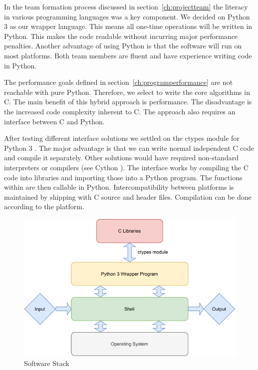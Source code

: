 In the team formation process discussed in section~\ref{ch:projectteam} the literacy in various programming languages was a key component. We decided on Python 3 as our wrapper language. This means all one-time operations will be written in Python. This makes the code readable without incurring major performance penalties. Another advantage of using Python is that the software will run on most platforms. Both team members are fluent and have experience writing code in Python.

The performance goals defined in section~\ref{ch:programperformance} are not reachable with pure Python. Therefore, we select to write the core algorithms in C. The main benefit of this hybrid approach is performance. The disadvantage is the increased code complexity inherent to C. The approach also requires an interface between C and Python.

After testing different interface solutions we settled on the ctypes module for Python 3 \cite{ctypes}. The major advantage is that we can write normal independent C code and compile it separately. Other solutions would have required non-standard interpreters or compilers (see Cython \cite{cython}). The interface works by compiling the C code into libraries and importing those into a Python program. The functions within are then callable in Python. Intercompatibility between platforms is maintained by shipping with C source and header files. Compilation can be done according to the platform.

\begin{figure}
  \centering
  \includegraphics{data/figures/stack.pdf}
  \caption{Software Stack}
  \label{fig:stack}
\end{figure}


